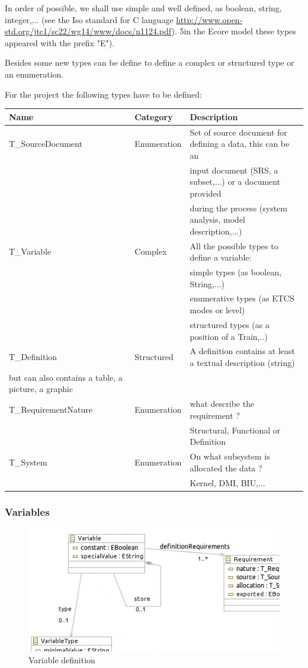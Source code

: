 In order of possible, we shall use simple and well defined, as boolean, string, integer,... (see the Iso standard for C language \url{http://www.open-std.org/jtc1/sc22/wg14/www/docs/n1124.pdf}). 5in the Ecore model these types appeared with the prefix "E").

Besides some new types can be define to define a complex or structured type or an enumeration.

For the project the following types have to be defined:

\begin{tabular}{|l | l | l | }
\hline
Name & Category & Description \\
\hline
T\_SourceDocument & Enumeration & Set of source document for defining a data, this can be an \\
& & input document (SRS, a subset,...) or a document provided \\
& & during the process (system analysis, model description,...) \\
\hline
T\_Variable & Complex & All the possible types to define a variable: \\
& & simple types (as boolean, String,...)  \\
& & enumerative types (as ETCS modes or level) \\
& & structured types (as a position of a Train,..) \\
\hline
T\_Definition & Structured & A definition contains at least a textual description (string)  \\
but can also contains a table, a picture, a graphic \\
\hline
T\_RequirementNature & Enumeration & what describe the requirement ? \\
& & Structural, Functional or Definition\\
\hline
T\_System & Enumeration & On what subsystem is allocated the data ? \\
& & Kernel, DMI, BIU,...\\
\hline
\end{tabular}


\subsubsection{Variables}


\begin{figure}[ht]
  \centering
  \includegraphics{DataModel/Variable1.png}
  \caption{Variable definition}
  \label{fig:variable}
\end{figure}

